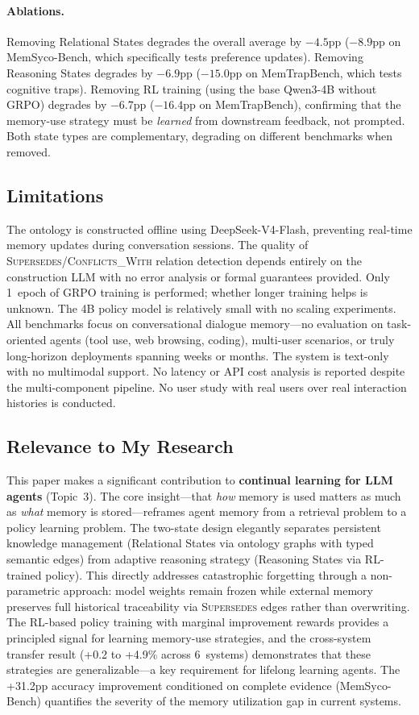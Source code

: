 \documentclass[11pt,a4paper]{article}
\begin{document}
\paragraph{Ablations.}
Removing Relational States degrades the overall average by $-4.5$pp ($-8.9$pp on MemSyco-Bench, which specifically tests preference updates). Removing Reasoning States degrades by $-6.9$pp ($-15.0$pp on MemTrapBench, which tests cognitive traps). Removing RL training (using the base Qwen3-4B without GRPO) degrades by $-6.7$pp ($-16.4$pp on MemTrapBench), confirming that the memory-use strategy must be \emph{learned} from downstream feedback, not prompted. Both state types are complementary, degrading on different benchmarks when removed.

\subsection{Limitations}
The ontology is constructed offline using DeepSeek-V4-Flash, preventing real-time memory updates during conversation sessions. The quality of \textsc{Supersedes}/\textsc{Conflicts\_With} relation detection depends entirely on the construction LLM with no error analysis or formal guarantees provided. Only 1~epoch of GRPO training is performed; whether longer training helps is unknown. The 4B policy model is relatively small with no scaling experiments. All benchmarks focus on conversational dialogue memory---no evaluation on task-oriented agents (tool use, web browsing, coding), multi-user scenarios, or truly long-horizon deployments spanning weeks or months. The system is text-only with no multimodal support. No latency or API cost analysis is reported despite the multi-component pipeline. No user study with real users over real interaction histories is conducted.

\subsection{Relevance to My Research}
This paper makes a significant contribution to \textbf{continual learning for LLM agents} (Topic~3). The core insight---that \emph{how} memory is used matters as much as \emph{what} memory is stored---reframes agent memory from a retrieval problem to a policy learning problem. The two-state design elegantly separates persistent knowledge management (Relational States via ontology graphs with typed semantic edges) from adaptive reasoning strategy (Reasoning States via RL-trained policy). This directly addresses catastrophic forgetting through a non-parametric approach: model weights remain frozen while external memory preserves full historical traceability via \textsc{Supersedes} edges rather than overwriting. The RL-based policy training with marginal improvement rewards provides a principled signal for learning memory-use strategies, and the cross-system transfer result (+0.2 to +4.9\% across 6~systems) demonstrates that these strategies are generalizable---a key requirement for lifelong learning agents. The +31.2pp accuracy improvement conditioned on complete evidence (MemSyco-Bench) quantifies the severity of the memory utilization gap in current systems.
\end{document}
